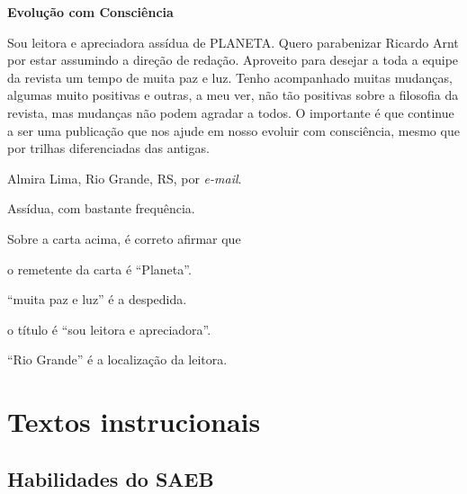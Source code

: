 \begin{myquote}
\textbf{Evolução com Consciência}

Sou leitora e apreciadora assídua de PLANETA. Quero parabenizar Ricardo
Arnt por estar assumindo a direção de redação. Aproveito para desejar a
toda a equipe da revista um tempo de muita paz e luz. Tenho acompanhado
muitas mudanças, algumas muito positivas e outras, a meu ver, não tão
positivas sobre a filosofia da revista, mas mudanças não podem agradar a
todos. O importante é que continue a ser uma publicação que nos ajude em
nosso evoluir com consciência, mesmo que por trilhas diferenciadas das
antigas.

\begin{flushright}
Almira Lima, Rio Grande, RS, por \emph{e-mail}.
\end{flushright}


\begin{small}
 Assídua, com bastante frequência.
\end{small}
\end{myquote}

Sobre a carta acima, é correto afirmar que 

\begin{escolha}
\item o remetente da carta é ``Planeta''.

\item ``muita paz e luz'' é a despedida.

\item o título é ``sou leitora e apreciadora''.

\item ``Rio Grande'' é a localização da leitora.
\end{escolha}


\chapter{Textos instrucionais}

\vspace*{-1cm}\enlargethispage{\baselineskip}

\section*{Habilidades do SAEB}

